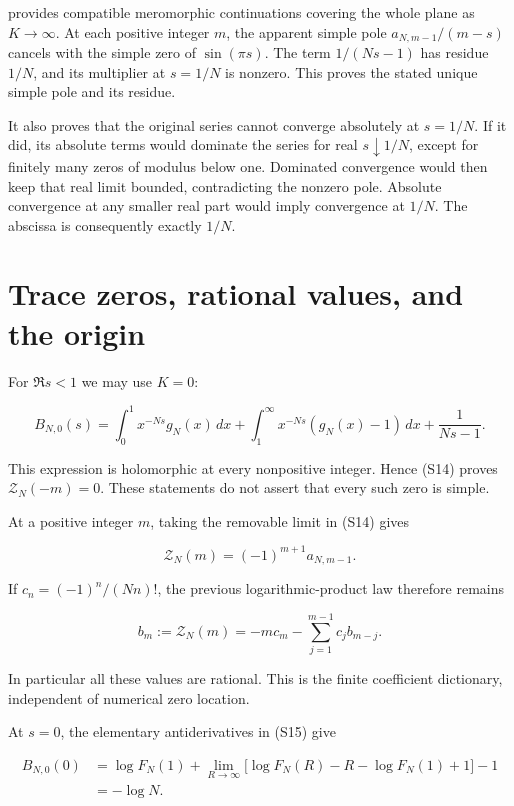 provides compatible meromorphic continuations covering the whole plane
as \(K\to\infty\). At each positive integer \(m\), the apparent simple
pole \(a_{N,m-1}/(m-s)\) cancels with the simple zero of
\(\sin(\pi s)\). The term \(1/(Ns-1)\) has residue \(1/N\), and its
multiplier at \(s=1/N\) is nonzero. This proves the stated unique simple
pole and its residue.

It also proves that the original series cannot converge absolutely at
\(s=1/N\). If it did, its absolute terms would dominate the series for
real \(s\downarrow1/N\), except for finitely many zeros of modulus below
one. Dominated convergence would then keep that real limit bounded,
contradicting the nonzero pole. Absolute convergence at any smaller real
part would imply convergence at \(1/N\). The abscissa is consequently
exactly \(1/N\).

\hypertarget{trace-zeros-rational-values-and-the-origin}{%
\section{Trace zeros, rational values, and the
origin}\label{trace-zeros-rational-values-and-the-origin}}

For \(\Re s<1\) we may use \(K=0\):

\[
B_{N,0}(s)=\int_0^1x^{-Ns}g_N(x)\,dx
+\int_1^\infty x^{-Ns}(g_N(x)-1)\,dx+\frac1{Ns-1}.
\tag{S15}
\]

This expression is holomorphic at every nonpositive integer. Hence (S14)
proves \(\mathcal Z_N(-m)=0\). These statements do not assert that every
such zero is simple.

At a positive integer \(m\), taking the removable limit in (S14) gives

\[
\mathcal Z_N(m)=(-1)^{m+1}a_{N,m-1}.
\tag{S16}
\]

If \(c_n=(-1)^n/(Nn)!\), the previous logarithmic-product law therefore
remains

\[
b_m:=\mathcal Z_N(m)
=-m c_m-\sum_{j=1}^{m-1}c_jb_{m-j}.
\tag{S17}
\]

In particular all these values are rational. This is the finite
coefficient dictionary, independent of numerical zero location.

At \(s=0\), the elementary antiderivatives in (S15) give

\[
\begin{aligned}
B_{N,0}(0)
&=\log F_N(1)
 +\lim_{R\to\infty}\bigl[\log F_N(R)-R-\log F_N(1)+1\bigr]-1\\
&=-\log N.
\end{aligned}
\]

